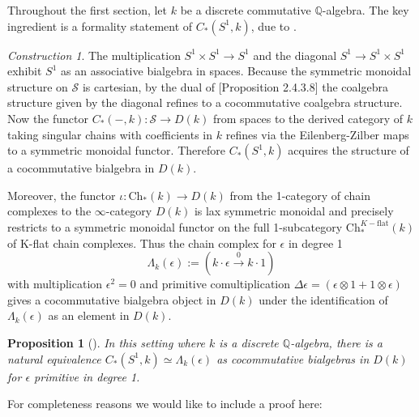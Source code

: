 \documentclass[10pt, reqno]{amsart}
\newtheorem{proposition}[theorem]{Proposition}
\theoremstyle{definition}
\theoremstyle{remark}
\newtheorem{construction}[theorem]{Construction}
\newcommand{\Q}{\mathbb{Q}}
\newcommand{\Spc}{\mathcal{S}}
\newcommand{\Ch}{\mathrm{Ch}}
\begin{document}
Throughout the first section, let $k$ be a discrete commutative $\Q$-algebra.
The key ingredient is a formality statement of $C_*(S^1,k)$, due to \cite{TV11}.

\begin{construction}\label{A}
	The multiplication $S^1\times S^1\to S^1$ and the diagonal $S^1\to S^1\times S^1$ exhibit $S^1$ as an associative bialgebra in spaces. Because the symmetric monoidal structure on $\Spc$ is cartesian, by the dual of \cite{Lur15}[Proposition 2.4.3.8] the coalgebra structure given by the diagonal refines to a cocommutative coalgebra structure. Now the functor $C_*(-,k)\colon \Spc\to D(k)$ from spaces to the derived category of $k$ taking singular chains with coefficients in $k$ refines via the Eilenberg-Zilber maps to a symmetric monoidal functor. Therefore $C_*(S^1,k)$ acquires the structure of a cocommutative bialgebra in $D(k)$.
	
	Moreover, the functor $\iota\colon\Ch_*(k)\to D(k)$ from the 1-category of chain complexes to the $\infty$-category $D(k)$ is lax symmetric monoidal and precisely restricts to a symmetric monoidal functor on the full 1-subcategory $\Ch_*^{K-\mathrm{flat}}(k)$ of K-flat chain complexes. Thus the chain complex for $\epsilon$ in degree 1
	\[\Lambda_k(\epsilon):=(k\cdot \epsilon\xrightarrow 0 k\cdot 1)\]
	with multiplication $\epsilon^2=0$ and primitive comultiplication $\Delta \epsilon=(\epsilon\otimes 1+1\otimes\epsilon)$ gives a cocommutative bialgebra object in $D(k)$ under the identification of $\Lambda_k(\epsilon)$ as an element in $D(k)$.
\end{construction}

\begin{proposition}[\cite{TV11}]\label{formal}
	In this setting where $k$ is a discrete $\Q$-algebra, there is a natural equivalence $C_*(S^1,k)\simeq \Lambda_k(\epsilon)$  as cocommutative bialgebras in $D(k)$ for $\epsilon$ primitive in degree 1.
\end{proposition}
For completeness reasons we would like to include a proof here:
\end{document}
